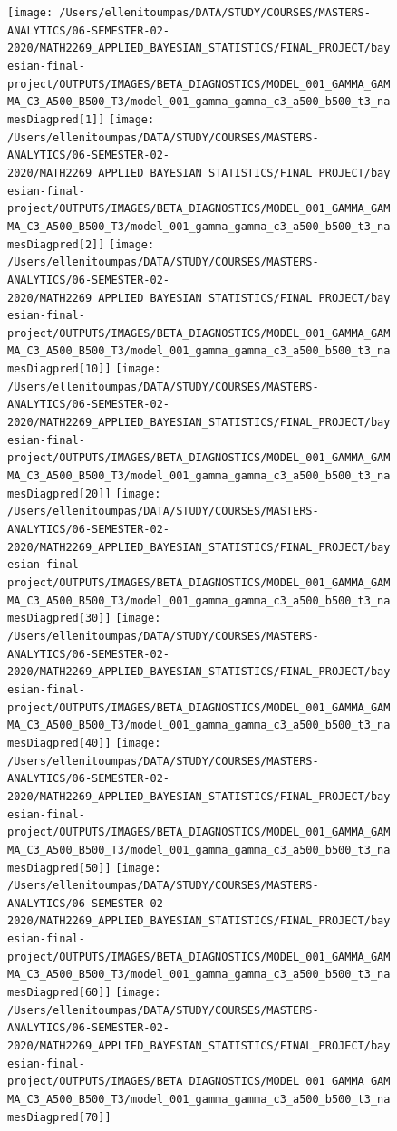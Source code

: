 \documentclass[12pt]{article}
\begin{document}
\begin{figure}[H]
\texttt{[image: /Users/ellenitoumpas/DATA/STUDY/COURSES/MASTERS-ANALYTICS/06-SEMESTER-02-2020/MATH2269\_APPLIED\_BAYESIAN\_STATISTICS/FINAL\_PROJECT/bayesian-final-project/OUTPUTS/IMAGES/BETA\_DIAGNOSTICS/MODEL\_001\_GAMMA\_GAMMA\_C3\_A500\_B500\_T3/model\_001\_gamma\_gamma\_c3\_a500\_b500\_t3\_namesDiagpred[1]]} \texttt{[image: /Users/ellenitoumpas/DATA/STUDY/COURSES/MASTERS-ANALYTICS/06-SEMESTER-02-2020/MATH2269\_APPLIED\_BAYESIAN\_STATISTICS/FINAL\_PROJECT/bayesian-final-project/OUTPUTS/IMAGES/BETA\_DIAGNOSTICS/MODEL\_001\_GAMMA\_GAMMA\_C3\_A500\_B500\_T3/model\_001\_gamma\_gamma\_c3\_a500\_b500\_t3\_namesDiagpred[2]]} \texttt{[image: /Users/ellenitoumpas/DATA/STUDY/COURSES/MASTERS-ANALYTICS/06-SEMESTER-02-2020/MATH2269\_APPLIED\_BAYESIAN\_STATISTICS/FINAL\_PROJECT/bayesian-final-project/OUTPUTS/IMAGES/BETA\_DIAGNOSTICS/MODEL\_001\_GAMMA\_GAMMA\_C3\_A500\_B500\_T3/model\_001\_gamma\_gamma\_c3\_a500\_b500\_t3\_namesDiagpred[10]]} \texttt{[image: /Users/ellenitoumpas/DATA/STUDY/COURSES/MASTERS-ANALYTICS/06-SEMESTER-02-2020/MATH2269\_APPLIED\_BAYESIAN\_STATISTICS/FINAL\_PROJECT/bayesian-final-project/OUTPUTS/IMAGES/BETA\_DIAGNOSTICS/MODEL\_001\_GAMMA\_GAMMA\_C3\_A500\_B500\_T3/model\_001\_gamma\_gamma\_c3\_a500\_b500\_t3\_namesDiagpred[20]]} \texttt{[image: /Users/ellenitoumpas/DATA/STUDY/COURSES/MASTERS-ANALYTICS/06-SEMESTER-02-2020/MATH2269\_APPLIED\_BAYESIAN\_STATISTICS/FINAL\_PROJECT/bayesian-final-project/OUTPUTS/IMAGES/BETA\_DIAGNOSTICS/MODEL\_001\_GAMMA\_GAMMA\_C3\_A500\_B500\_T3/model\_001\_gamma\_gamma\_c3\_a500\_b500\_t3\_namesDiagpred[30]]} \texttt{[image: /Users/ellenitoumpas/DATA/STUDY/COURSES/MASTERS-ANALYTICS/06-SEMESTER-02-2020/MATH2269\_APPLIED\_BAYESIAN\_STATISTICS/FINAL\_PROJECT/bayesian-final-project/OUTPUTS/IMAGES/BETA\_DIAGNOSTICS/MODEL\_001\_GAMMA\_GAMMA\_C3\_A500\_B500\_T3/model\_001\_gamma\_gamma\_c3\_a500\_b500\_t3\_namesDiagpred[40]]} \texttt{[image: /Users/ellenitoumpas/DATA/STUDY/COURSES/MASTERS-ANALYTICS/06-SEMESTER-02-2020/MATH2269\_APPLIED\_BAYESIAN\_STATISTICS/FINAL\_PROJECT/bayesian-final-project/OUTPUTS/IMAGES/BETA\_DIAGNOSTICS/MODEL\_001\_GAMMA\_GAMMA\_C3\_A500\_B500\_T3/model\_001\_gamma\_gamma\_c3\_a500\_b500\_t3\_namesDiagpred[50]]} \texttt{[image: /Users/ellenitoumpas/DATA/STUDY/COURSES/MASTERS-ANALYTICS/06-SEMESTER-02-2020/MATH2269\_APPLIED\_BAYESIAN\_STATISTICS/FINAL\_PROJECT/bayesian-final-project/OUTPUTS/IMAGES/BETA\_DIAGNOSTICS/MODEL\_001\_GAMMA\_GAMMA\_C3\_A500\_B500\_T3/model\_001\_gamma\_gamma\_c3\_a500\_b500\_t3\_namesDiagpred[60]]} \texttt{[image: /Users/ellenitoumpas/DATA/STUDY/COURSES/MASTERS-ANALYTICS/06-SEMESTER-02-2020/MATH2269\_APPLIED\_BAYESIAN\_STATISTICS/FINAL\_PROJECT/bayesian-final-project/OUTPUTS/IMAGES/BETA\_DIAGNOSTICS/MODEL\_001\_GAMMA\_GAMMA\_C3\_A500\_B500\_T3/model\_001\_gamma\_gamma\_c3\_a500\_b500\_t3\_namesDiagpred[70]]} \end{figure}
\end{document}
